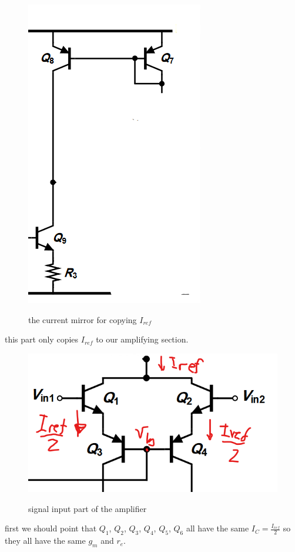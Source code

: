 \documentclass[11pt]{article}
\begin{document}
\begin{figure}[H]
    \begin{center}
        \includegraphics[scale=0.7]{Fig/mirror.png}
        \label{fig:mirror}
        \caption{the current mirror for copying $I_{ref}$}
    \end{center}
\end{figure}

this part only copies $I_{ref}$ to our amplifying section.

\begin{figure}[H]
    \begin{center}
        \includegraphics[scale=0.7]{Fig/signalInput.png}
        \label{fig:inputSignal}
        \caption{signal input part of the amplifier}
    \end{center}
\end{figure}
first we should point that $Q_1$, $Q_2$, $Q_3$, $Q_4$, $Q_5$, $Q_6$
all have the same $ I_C = \frac{I_{ref}}{2} $ so they all have the same $g_m$ and $r_e$. \\ \\
\end{document}
